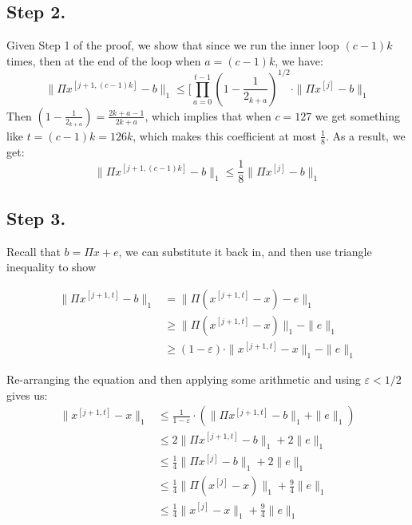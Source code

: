 \documentclass[11pt]{article}
\newcommand{\eps}{\varepsilon}
\begin{document}
\subsection{Step 2.}
Given Step 1 of the proof, we show that since we run the inner loop $(c - 1)k$ times, then at the end of the loop when $a = (c - 1)k$, we have:
$$\|\Pi x^{[j + 1, (c - 1)k]} - b\|_1 \le [\prod_{a = 0}^{t - 1} (1 - \frac{1}{2_{k + a}})^{1/2} \cdot \|\Pi x^{[j]} - b\|_1$$
Then $(1 - \frac{1}{2_{k + a}}) = \frac{2k + a - 1}{2k + a}$, which implies that when $c = 127$ we get something like $t = (c - 1)k = 126k$, which makes this coefficient at most $\frac{1}{8}$. As a result, we get:
\begin{equation}
\|\Pi x^{[j + 1, (c - 1)k]} - b\|_1 \le \frac{1}{8} \|\Pi x^{[j]} - b\|_1
\end{equation}

\subsection{Step 3.}
Recall that $b = \Pi x + e$, we can substitute it back in, and then use triangle inequality to show 

\begin{align}
\|\Pi x^{[j + 1, t]} - b\|_1 &= \|\Pi(x^{[j + 1, t]} - x) - e\|_1 \\
&\ge \|\Pi(x^{[j + 1, t]} - x)\|_1 - \|e\|_1 \\
&\ge (1 - \varepsilon) \cdot \|x^{[j +  1, t]} - x\|_1 - \|e\|_1
\end{align}

Re-arranging the equation and then applying some arithmetic and using $\eps < 1/2$ gives us:
\begin{align*}
\|x^{[j +  1, t]} - x\|_1 &\le \frac{1}{1-\varepsilon}\cdot (\|\Pi x^{[j + 1, t]} - b\|_1 + \|e\|_1)\\
{}&\le 2\|\Pi x^{[j + 1, t]} - b\|_1 + 2\|e\|_1 \\
{}&\le \frac{1}{4}\|\Pi x^{[j]} - b\|_1 + 2\|e\|_1 \\
{}&\le \frac{1}{4}\|\Pi (x^{[j]} - x)\|_1 + \frac{9}{4}\|e\|_1 \\
{}&\le \frac{1}{4}\|x^{[j]} - x\|_1 + \frac{9}{4}\|e\|_1 
\end{align*}
\end{document}
